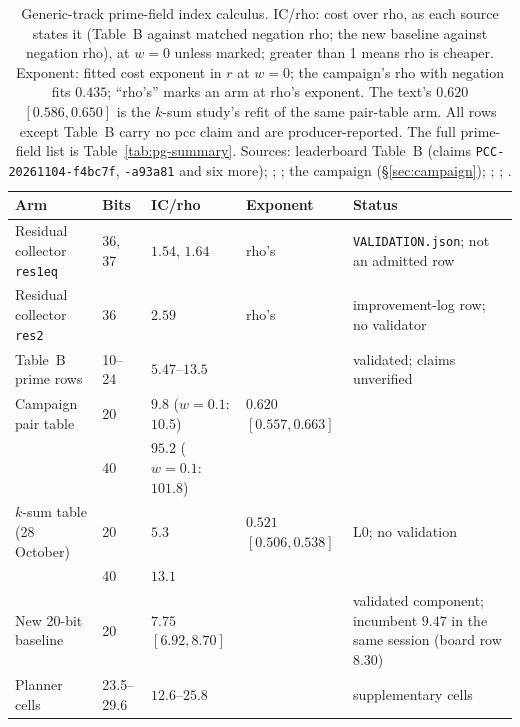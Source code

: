 \begin{table}[t]
\centering\small
\begin{tabularx}{\linewidth}{@{}>{\raggedright}p{3.6cm}l>{\raggedright}p{2.6cm}>{\raggedright}p{2.4cm}>{\raggedright\arraybackslash}X@{}}
\toprule
Arm & Bits & IC/rho & Exponent & Status \\
\midrule
Residual collector \texttt{res1eq} & 36, 37 & $1.54$, $1.64$ & rho's &
  \texttt{VALIDATION.json}; not an admitted row \\
Residual collector \texttt{res2} & 36 & $2.59$ & rho's & improvement-log
  row; no validator \\
\addlinespace
Table~B prime rows & 10--24 & $5.47$--$13.5$ & & validated; claims
  unverified \\
\addlinespace
Campaign pair table & 20 & $9.8$ ($w=0.1$: $10.5$) & $0.620$ $[0.557,0.663]$ & \\
 & 40 & $95.2$ ($w=0.1$: $101.8$) & & \\
\addlinespace
$k$-sum table (28 October) & 20 & $5.3$ & $0.521$ $[0.506,0.538]$ & L0; no validation \\
 & 40 & $13.1$ & & \\
\addlinespace
New 20-bit baseline & 20 & $7.75$ $[6.92,8.70]$ & & validated component;
  incumbent $9.47$ in the same session (board row $8.30$) \\
\addlinespace
Planner cells & 23.5--29.6 & $12.6$--$25.8$ & & supplementary cells \\
\bottomrule
\end{tabularx}
\caption[]{Generic-track prime-field index calculus. IC/rho: cost over
rho, as each source states it (Table~B against matched negation rho; the
new baseline against negation rho), at $w=0$ unless marked; greater than 1
means rho is cheaper. Exponent: fitted cost exponent in $r$ at $w=0$; the
campaign's rho with negation fits $0.435$; ``rho's'' marks an arm at rho's
exponent. The text's $0.620$ $[0.586,0.650]$ is the $k$-sum study's refit
of the same pair-table arm. All rows except Table~B carry no pcc claim and
are producer-reported. The full prime-field list is
Table~\ref{tab:pg-summary}. Sources: leaderboard Table~B
(claims \texttt{PCC-20261104-f4bc7f}, \texttt{-a93a81} and six more);
;
; the campaign
(\S\ref{sec:campaign}); ;
;
.}
\label{tab:distance-prime}
\end{table}

